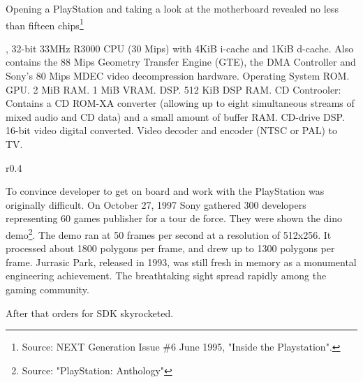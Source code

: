 \par
Opening a PlayStation and taking a look at the motherboard revealed no less than fifteen chips\footnote{Source: NEXT Generation Issue \#6 June 1995, "Inside the Playstation".}\\
\par
{}, 32-bit 33MHz R3000 CPU (30 Mips) with  4KiB i-cache and 1KiB d-cache. Also contains the 88 Mips Geometry Transfer Engine (GTE), the DMA Controller and Sony's 80 Mips MDEC video decompression hardware.
 Operating System ROM.
 GPU.
 2 MiB RAM.
 1 MiB VRAM.
 DSP.
 512 KiB DSP RAM.
 CD Controoler: Contains a CD ROM-XA converter (allowing up to eight simultaneous streams of mixed audio and CD data) and a small amount of buffer RAM.
 CD-drive DSP.
 16-bit video digital converted.
 Video decoder and encoder (NTSC or PAL) to TV.


\par
\begin{wrapfigure}[10]{r}{0.4\textwidth}{
\centering {}}
\end{wrapfigure}
To convince developer to get on board and work with the PlayStation was originally difficult. On October 27, 1997 Sony gathered 300 developers representing 60 games publisher for a tour de force. They were shown the dino demo\footnote{Source: "PlayStation: Anthology"}. The demo ran at 50 frames per second at a resolution of 512x256. It processed about 1800 polygons per frame, and drew up to 1300 polygons per frame. Jurrasic Park, released in 1993, was still fresh in memory as a monumental engineering achievement. The breathtaking sight spread rapidly among the gaming community.\\
\par
 After that orders for SDK skyrocketed.
 
 






